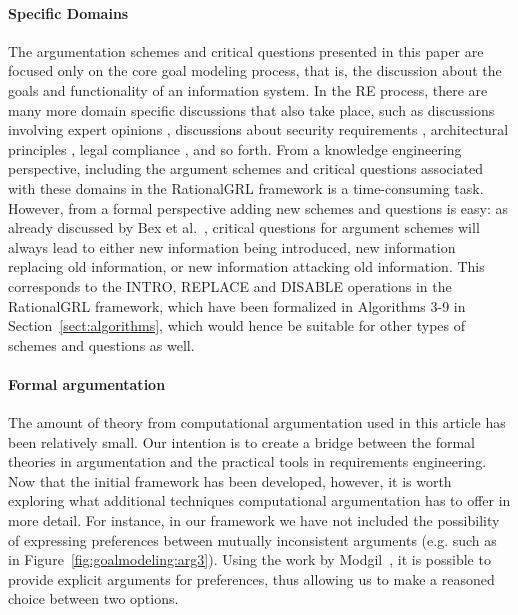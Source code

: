 \paragraph{Specific Domains}
The argumentation schemes and critical questions presented in this paper are focused only on the core goal modeling process, that is, the discussion about the goals and functionality of an information system. In the RE process, there are many more domain specific discussions that also take place, such as discussions involving expert opinions \cite{murukannaiah2015}, discussions about security requirements \cite{haley2008security,yu2015automated,ionita2014argumentation}, architectural principles \cite{marosin-etal:caise2016}, legal compliance \cite{Ghanavati2013}, and so forth. From a knowledge engineering perspective, including the argument schemes and critical questions associated with these domains in the RationalGRL framework is a time-consuming task. However, from a formal perspective adding new schemes and questions is easy: as already discussed by Bex et al.~\cite{bexEtal2003}, critical questions for argument schemes will always lead to either new information being introduced, new information replacing old information, or new information attacking old information. This corresponds to the \textsf{INTRO}, \textsf{REPLACE} and \textsf{DISABLE} operations in the RationalGRL framework, which have been formalized in Algorithms 3-9 in Section~\ref{sect:algorithms}, which would hence be suitable for other types of schemes and questions as well.

\paragraph{Formal argumentation}
The amount of theory from computational argumentation used in this article has been relatively small. Our intention is to create a bridge between the formal theories in argumentation and the practical tools in requirements engineering. Now that the initial framework has been developed, however, it is worth exploring what additional techniques computational argumentation has to offer in more detail. For instance, in our framework we have not included the possibility of expressing preferences between mutually inconsistent arguments (e.g. such as in Figure~\ref{fig:goalmodeling:arg3}). Using the work by Modgil~\cite{modgil2009}, it is possible to provide explicit arguments for preferences, thus allowing us to make a reasoned choice between two options. 


